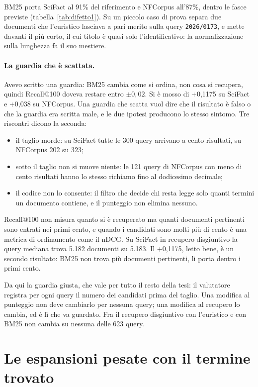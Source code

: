 BM25 porta SciFact al 91\% del riferimento e NFCorpus all'87\%, dentro le fasce
previste (tabella~\ref{tab:difetto1}). Su un piccolo caso di prova separa due
documenti che l'euristico lasciava a pari merito sulla query \texttt{2026/0173}, e
mette davanti il più corto, il cui titolo è quasi solo l'identificativo: la
normalizzazione sulla lunghezza fa il suo mestiere.

\paragraph{La guardia che è scattata.} Avevo scritto una guardia: BM25 cambia come
si ordina, non cosa si recupera, quindi Recall@100 doveva restare entro $\pm0{,}02$.
Si è mosso di +0,1175 su SciFact e +0,038 su NFCorpus. Una guardia che scatta vuol
dire che il risultato è falso o che la guardia era scritta male, e le due ipotesi
producono lo stesso sintomo. Tre riscontri dicono la seconda:
\begin{itemize}
  \item il taglio morde: su SciFact tutte le 300 query arrivano a cento risultati,
        su NFCorpus 202 su 323;
  \item sotto il taglio non si muove niente: le 121 query di NFCorpus con meno di
        cento risultati hanno lo stesso richiamo fino al dodicesimo decimale;
  \item il codice non lo consente: il filtro che decide chi resta legge solo
        quanti termini un documento contiene, e il punteggio non elimina nessuno.
\end{itemize}
Recall@100 non misura quanto si è recuperato ma quanti documenti pertinenti sono
entrati nei primi cento, e quando i candidati sono molti più di cento è una
metrica di ordinamento come il nDCG. Su SciFact in recupero disgiuntivo la query
mediana trova 5.182 documenti su 5.183. Il +0,1175, letto bene, è un secondo
risultato: BM25 non trova più documenti pertinenti, li porta dentro i primi cento.

Da qui la guardia giusta, che vale per tutto il resto della tesi: il valutatore
registra per ogni query il numero dei candidati prima del taglio. Una modifica al
punteggio non deve cambiarlo per nessuna query; una modifica al recupero lo
cambia, ed è lì che va guardato. Fra il recupero disgiuntivo con l'euristico e
con BM25 non cambia su nessuna delle 623 query.

\section{Le espansioni pesate con il termine trovato}\label{sec:espansioni}

